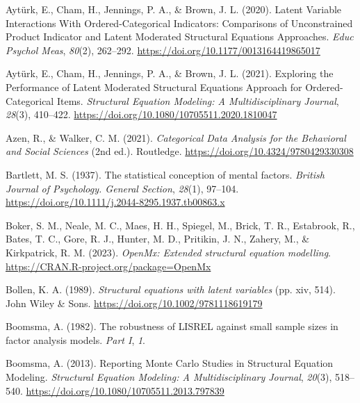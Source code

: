 \documentclass[
  man]{apa6}
\newlength{\cslhangindent}
\newlength{\cslentryspacingunit} %
\newenvironment{CSLReferences}[2] %
 {%
  \setlength{\parindent}{0pt}
  \ifodd #1
  \let\oldpar\par
  \def\par{\hangindent=\cslhangindent\oldpar}
  \fi
  \setlength{\parskip}{#2\cslentryspacingunit}
 }%
 {}
\begin{document}
\begin{CSLReferences}{1}{0}
\leavevmode{}%
Aytürk, E., Cham, H., Jennings, P. A., \& Brown, J. L. (2020). Latent {Variable Interactions With Ordered-Categorical Indicators}: {Comparisons} of {Unconstrained Product Indicator} and {Latent Moderated Structural Equations Approaches}. \emph{Educ Psychol Meas}, \emph{80}(2), 262--292. \url{https://doi.org/10.1177/0013164419865017}

\leavevmode{}%
Aytürk, E., Cham, H., Jennings, P. A., \& Brown, J. L. (2021). Exploring the {Performance} of {Latent Moderated Structural Equations Approach} for {Ordered-Categorical Items}. \emph{Structural Equation Modeling: A Multidisciplinary Journal}, \emph{28}(3), 410--422. \url{https://doi.org/10.1080/10705511.2020.1810047}

\leavevmode{}%
Azen, R., \& Walker, C. M. (2021). \emph{Categorical {Data Analysis} for the {Behavioral} and {Social Sciences}} (2nd ed.). Routledge. \url{https://doi.org/10.4324/9780429330308}

\leavevmode{}%
Bartlett, M. S. (1937). The statistical conception of mental factors. \emph{British Journal of Psychology. General Section}, \emph{28}(1), 97--104. \url{https://doi.org/10.1111/j.2044-8295.1937.tb00863.x}

\leavevmode{}%
Boker, S. M., Neale, M. C., Maes, H. H., Spiegel, M., Brick, T. R., Estabrook, R., Bates, T. C., Gore, R. J., Hunter, M. D., Pritikin, J. N., Zahery, M., \& Kirkpatrick, R. M. (2023). \emph{OpenMx: Extended structural equation modelling}. \url{https://CRAN.R-project.org/package=OpenMx}

\leavevmode{}%
Bollen, K. A. (1989). \emph{Structural equations with latent variables} (pp. xiv, 514). John Wiley \& Sons. \url{https://doi.org/10.1002/9781118619179}

\leavevmode{}%
Boomsma, A. (1982). The robustness of {LISREL} against small sample sizes in factor analysis models. \emph{Part I}, \emph{1}.

\leavevmode{}%
Boomsma, A. (2013). Reporting {Monte Carlo Studies} in {Structural Equation Modeling}. \emph{Structural Equation Modeling: A Multidisciplinary Journal}, \emph{20}(3), 518--540. \url{https://doi.org/10.1080/10705511.2013.797839}


\end{CSLReferences}
\end{document}
